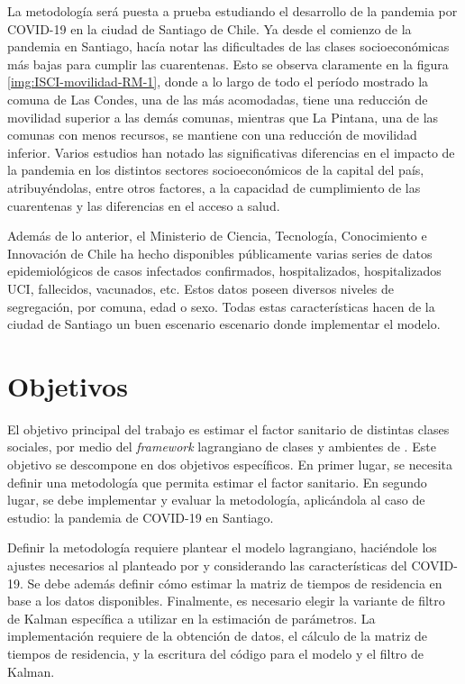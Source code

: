 \begin{intro}
La metodología será puesta a prueba estudiando el desarrollo de la pandemia por COVID-19 en la ciudad de Santiago de Chile. Ya desde el comienzo de la pandemia en Santiago, \cite{Olivares2020} hacía notar las dificultades de las clases socioeconómicas más bajas para cumplir las cuarentenas. Esto se observa claramente en la figura \ref{img:ISCI-movilidad-RM-1}, donde a lo largo de todo el período mostrado la comuna de Las Condes, una de las más acomodadas, tiene una reducción de movilidad superior a las demás comunas, mientras que La Pintana, una de las comunas con menos recursos, se mantiene con una reducción de movilidad inferior. Varios estudios \cite{Mena2021}\cite{Bennett2021}\cite{Gozzi2021} han notado las significativas diferencias en el impacto de la pandemia en los distintos sectores socioeconómicos de la capital del país, atribuyéndolas, entre otros factores, a la capacidad de cumplimiento de las cuarentenas y las diferencias en el acceso a salud.

Además de lo anterior, el Ministerio de Ciencia, Tecnología, Conocimiento e Innovación de Chile ha hecho disponibles públicamente \cite{MINCIENCIA} varias series de datos epidemiológicos de casos infectados confirmados, hospitalizados, hospitalizados UCI, fallecidos, vacunados, etc. Estos datos poseen diversos niveles de segregación, por comuna, edad o sexo. Todas estas características hacen de la ciudad de Santiago un buen escenario escenario donde implementar el modelo.




\section*{Objetivos}

El objetivo principal del trabajo es estimar el factor sanitario de distintas clases sociales, por medio del \textit{framework} lagrangiano de clases y ambientes de \cite{Bichara2018}. Este objetivo se descompone en dos objetivos específicos. En primer lugar, se necesita definir una metodología que permita estimar el factor sanitario. En segundo lugar, se debe implementar y evaluar la metodología, aplicándola al caso de estudio: la pandemia de COVID-19 en Santiago. 

Definir la metodología requiere plantear el modelo lagrangiano, haciéndole los ajustes necesarios al planteado por \cite{Bichara2018} y considerando las características del COVID-19. Se debe además definir cómo estimar la matriz de tiempos de residencia en base a los datos disponibles. Finalmente, es necesario elegir la variante de filtro de Kalman específica a utilizar en la estimación de parámetros. La implementación requiere de la obtención de datos, el cálculo de la matriz de tiempos de residencia, y la escritura del código para el modelo y el filtro de Kalman.


\end{intro}

